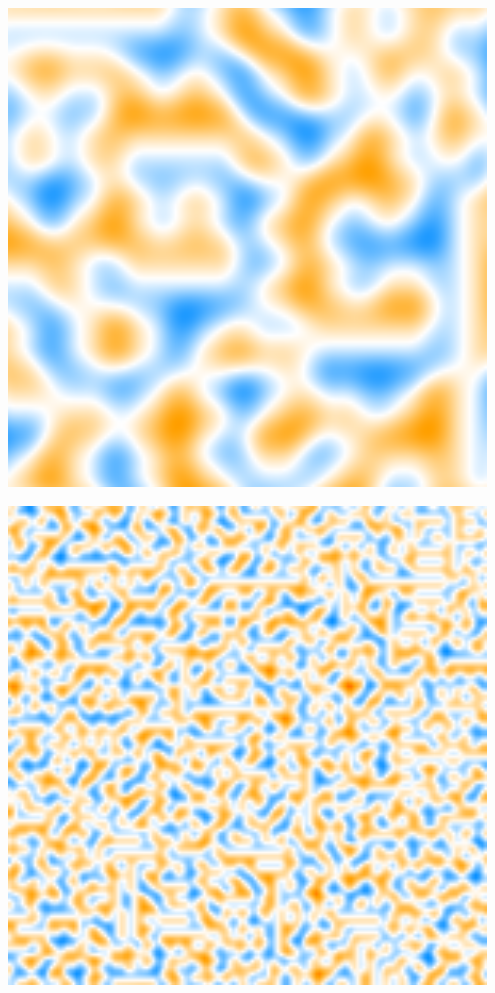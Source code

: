 \begin{center}
\begin{minipage}{.07\textwidth}
        \small{\ \\\ \\\ \\\ }
    \end{minipage}%
    \begin{minipage}{.31\textwidth}
        \centering
        \includegraphics[width=0.95\textwidth]{img/noise2.png}
        \small{}
    \end{minipage}%
    \begin{minipage}{.31\textwidth}
        \centering
        \includegraphics[width=0.95\textwidth]{img/noise3.png}

\end{minipage}
\end{center}
